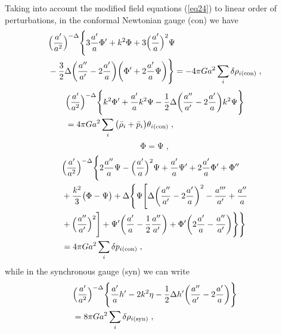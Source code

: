 \documentclass[11pt,twocolumn]{article}
\begin{document}
Taking into account the modified field equations (\ref{eq24}) to
linear order of perturbations, in the conformal Newtonian gauge (con)
we have
    \begin{align} \label{eq32}
    &\Big(\frac{a'}{a^2}\Big)^{-\mathrm{\Delta}}\Bigg{\{}3\frac{a'}{a}\mathrm{\Phi}'+k^2\mathrm{\Phi}+3\Big(\frac{a'}{a}\Big)^2\mathrm{\Psi} \nonumber \\
    &-\frac{3}{2}\mathrm{\Delta}\bigg(\frac{a''}{a'}-2\frac{a'}{a}\bigg)\bigg(\mathrm{\Phi}'+2\frac{a'}{a}\mathrm{\Psi}\bigg)\Bigg{\}}=-4\pi G a^2 \sum_{i}\delta \rho_{i(\mathrm{con})} \;,
    \end{align}
    \begin{align} \label{eq33}
    &\Big(\frac{a'}{a^2}\Big)^{-\mathrm{\Delta}}\Bigg{\{}k^2\mathrm{\Phi}'+\frac{a'}{a}k^2\mathrm{\Psi}-\frac{1}{2}\mathrm{\Delta}\bigg(\frac{a''}{a'}-2\frac{a'}{a}\bigg)k^2\mathrm{\Psi}\Bigg{\}} \nonumber \\
    &=4\pi G a^2 \sum_{i}\big(\bar{\rho}_i+\bar{p}_i\big)\theta_{i(\mathrm{con})} \;,
    \end{align}
    \begin{equation} \label{eq34}
    \mathrm{\Phi}=\mathrm{\Psi} \;,
    \end{equation}
    \begin{align} \label{eq35}
    &\Big(\frac{a'}{a^2}\Big)^{-\mathrm{\Delta}}\Bigg{\{}2\frac{a''}{a}\mathrm{\Psi}-\Big(\frac{a'}{a}\Big)^2\mathrm{\Psi}+\frac{a'}{a}\mathrm{\Psi}'+2\frac{a'}{a}\mathrm{\Phi}'+\mathrm{\Phi}'' \nonumber \\
    &+\frac{k^2}{3}\big(\mathrm{\Phi}-\mathrm{\Psi}\big)+\mathrm{\Delta}\Bigg{\{}\mathrm{\Psi}\Bigg[\mathrm{\Delta}\bigg(\frac{a''}{a'}-2\frac{a'}{a}\bigg)^2-\frac{a'''}{a'}+\frac{a''}{a} \nonumber \\
    &+\Big(\frac{a''}{a'}\Big)^2\Bigg]+\mathrm{\Psi}'\bigg(\frac{a'}{a}-\frac{1}{2}\frac{a''}{a'}\bigg)+\mathrm{\Phi}'\bigg(2\frac{a'}{a}-\frac{a''}{a'}\bigg)\Bigg{\}}\Bigg{\}} \nonumber \\
    &=4\pi G a^2 \sum_{i}\delta p_{i(\mathrm{con})} \;,
    \end{align}
while in the synchronous gauge (syn) we can write
    \begin{align} \label{eq36}
    &\Big(\frac{a'}{a^2}\Big)^{-\mathrm{\Delta}}\Bigg{\{}\frac{a'}{a}h'-2k^2\eta-\frac{1}{2}\mathrm{\Delta} h'\bigg(\frac{a''}{a'}-2\frac{a'}{a}\bigg)\Bigg{\}} \nonumber \\
    &=8\pi G a^2 \sum_{i}\delta \rho_{i(\mathrm{syn})} \;,
    \end{align}
\end{document}
